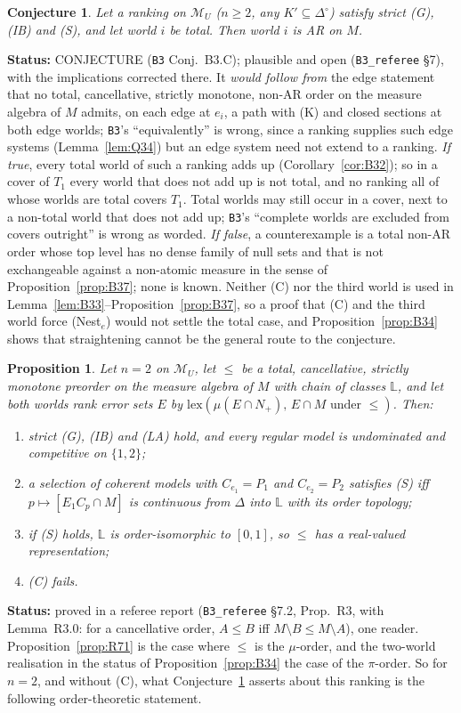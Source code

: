 \documentclass[11pt]{article}
\newtheorem{proposition}[theorem]{Proposition}
\newtheorem{conjecture}[theorem]{Conjecture}
\theoremstyle{definition}
\theoremstyle{remark}
\newcommand{\Di}{\Delta^{\circ}}
\newcommand{\M}{\mathcal M}
\newcommand{\src}[1]{\texttt{#1}}
\newcommand{\status}[1]{\par\smallskip\noindent\textbf{Status:} #1\par\smallskip}
\begin{document}
\begin{conjecture}\label{conj:B3C}
Let a ranking on $\M_U$ ($n\ge2$, any $K'\subseteq\Di$) satisfy strict (G), (IB) and (S), and let world $i$ be total. Then world $i$ is AR on $M$.
\end{conjecture}
\status{CONJECTURE (\src{B3} Conj.~B3.C); plausible and open (\src{B3\_referee} \S7), with the implications corrected there. It \emph{would follow from} the edge statement that no total, cancellative, strictly monotone, non-AR order on the measure algebra of $M$ admits, on each edge at $e_i$, a path with (K) and closed sections at both edge worlds; \src{B3}'s ``equivalently'' is wrong, since a ranking supplies such edge systems (Lemma~\ref{lem:Q34}) but an edge system need not extend to a ranking. \emph{If true}, every total world of such a ranking adds up (Corollary~\ref{cor:B32}); so in a cover of $T_1$ every world that does not add up is not total, and no ranking all of whose worlds are total covers $T_1$. Total worlds may still occur in a cover, next to a non-total world that does not add up; \src{B3}'s ``complete worlds are excluded from covers outright'' is wrong as worded. \emph{If false}, a counterexample is a total non-AR order whose top level has no dense family of null sets and that is not exchangeable against a non-atomic measure in the sense of Proposition~\ref{prop:B37}; none is known. Neither (C) nor the third world is used in Lemma~\ref{lem:B33}--Proposition~\ref{prop:B37}, so a proof that (C) and the third world force (Nest$_e$) would not settle the total case, and Proposition~\ref{prop:B34} shows that straightening cannot be the general route to the conjecture.}

\begin{proposition}\label{prop:B3R3}
Let $n=2$ on $\M_U$, let $\le$ be a total, cancellative, strictly monotone preorder on the measure algebra of $M$ with chain of classes $\mathbb L$, and let both worlds rank error sets $E$ by $\mathrm{lex}(\mu(E\cap N_+),\,E\cap M\text{ under }\le)$. Then:
\begin{enumerate}[leftmargin=*,label=(\alph*)]
\item strict (G), (IB) and (LA) hold, and every regular model is undominated and competitive on $\{1,2\}$;
\item a selection of coherent models with $C_{e_1}=P_1$ and $C_{e_2}=P_2$ satisfies (S) iff $p\mapsto[E_1C_p\cap M]$ is continuous from $\Delta$ into $\mathbb L$ with its order topology;
\item if (S) holds, $\mathbb L$ is order-isomorphic to $[0,1]$, so $\le$ has a real-valued representation;
\item (C) fails.
\end{enumerate}
\end{proposition}
\status{proved in a referee report (\src{B3\_referee} \S7.2, Prop.~R3, with Lemma~R3.0: for a cancellative order, $A\le B$ iff $M\setminus B\le M\setminus A$), one reader. Proposition~\ref{prop:R71} is the case where $\le$ is the $\mu$-order, and the two-world realisation in the status of Proposition~\ref{prop:B34} the case of the $\pi$-order. So for $n=2$, and without (C), what Conjecture~\ref{conj:B3C} asserts about this ranking is the following order-theoretic statement.}
\end{document}
